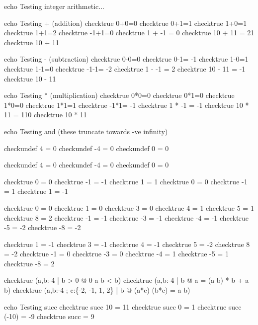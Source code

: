 %


echo Testing integer arithmetic...

echo     Testing + (addition)
checktrue 0+0=0
checktrue 0+1=1
checktrue 1+0=1
checktrue 1+1=2
checktrue -1+1=0
checktrue 1 + -1 = 0
checktrue 10 + 11 = 21
checktrue 10 + 11 


echo     Testing - (subtraction)
checktrue 0-0=0
checktrue 0-1= -1
checktrue 1-0=1
checktrue 1-1=0
checktrue -1-1= -2
checktrue 1 - -1 = 2
checktrue 10 - 11 = -1
checktrue 10 - 11 


echo     Testing * (multiplication)
checktrue 0*0=0
checktrue 0*1=0
checktrue 1*0=0
checktrue 1*1=1
checktrue -1*1= -1
checktrue 1 * -1 = -1
checktrue 10 * 11 = 110
checktrue 10 * 11 


echo     Testing \div and \mod   (these truncate towards -ve infinity)

checkundef 4  = 0
checkundef -4  = 0
checkundef 0  = 0

checkundef 4  = 0
checkundef -4  = 0
checkundef 0  = 0

checktrue 0  = 0
checktrue -1  = -1
checktrue 1  = 1
checktrue 0  = 0
checktrue -1  = 1
checktrue 1  = -1

checktrue 0  = 0
checktrue 1  = 0
checktrue 3  = 0
checktrue 4  = 1
checktrue 5  = 1
checktrue 8  = 2
checktrue -1  = -1
checktrue -3  = -1
checktrue -4  = -1
checktrue -5  = -2
checktrue -8  = -2

checktrue 1  = -1
checktrue 3  = -1
checktrue 4  = -1
checktrue 5  = -2
checktrue 8  = -2
checktrue -1  = 0
checktrue -3  = 0
checktrue -4  = 1
checktrue -5  = 1
checktrue -8  = 2

checktrue (\forall a,b:-4  | b > 0 @ 0 \leq a \mod b < b)
checktrue (\forall a,b:-4  | b  @ a = (a \div b) * b + a \mod b)
checktrue (\forall a,b:-4 ; c:\{-2, -1, 1, 2\} | b  @ (a*c) \div (b*c) = a \div b)

echo     Testing succ
checktrue succ 10 = 11
checktrue succ 0 = 1
checktrue succ (-10) = -9
checktrue succ = 9

